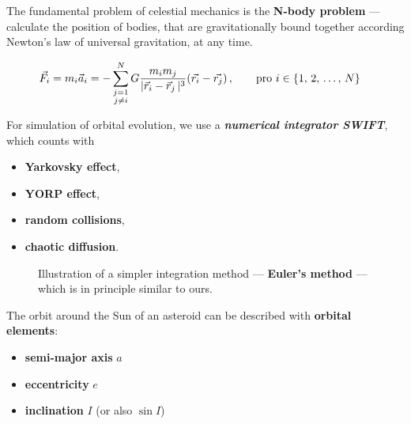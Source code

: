 \documentclass{beamer}
\newlength{\sep}
\newlength{\vyska}
\newlength{\vyskaA}
\newlength{\side}
\begin{document}
\begin{frame}
\begin{columns}[t]
\begin{column}{\side}
\vspace{\sep}

	\begin{tcolorbox}[title=Methods of celestial mechanics\vphantom{Úy},height=0.665\vyskaA]

		The fundamental problem of celestial mechanics is the \textbf{N-body problem} --- calculate the position of bodies, that are gravitationally bound together according Newton's law of universal gravitation, at any time.

		{\footnotesize
		\begin{align*} 
			\vec{F}_i = m_i\vec{a}_i &= -\sum_{\substack{j=1 \\ j\neq i}}^N G\frac{m_im_j}{\lvert \vec{r}_i-\vec{r}_j \,\rvert^3}(\vec{r_i}-\vec{r_j})\,, \qquad{\rm pro}\ i\in\{1,\,2,\,\dots,\,N\}
		\end{align*}}

		For simulation of orbital evolution, we use a \textbf{\it numerical integrator SWIFT}, which counts with  

\begin{itemize}
	\item \textbf{Yarkovsky effect},
	\item \textbf{YORP effect},
	\item \textbf{random collisions},
	\item \textbf{chaotic diffusion}.  
\end{itemize}

		\begin{figure}[!htb]
			\centering 
			\begin{subfigure}[b]{0.45\textwidth}
			\centering 
			\end{subfigure}
			\begin{subfigure}[b]{0.45\textwidth}
			\centering 
			\end{subfigure}
			\caption{Illustration of a simpler integration method --- \textbf{Euler's method} --- which is in principle similar to ours.}
		\end{figure}
		The orbit around the Sun of an asteroid can be described with \textbf{orbital elements}:
		\vspace{-12pt}
		\begin{itemize}
			\item \textbf{semi-major axis} $a$
			\item \textbf{eccentricity} $e$
			\item \textbf{inclination} $I$ (or also $\sin I$) 
		\end{itemize}
		\vspace{-12pt}


\end{tcolorbox}
\end{column}
\end{columns}
\end{frame}
\end{document}
